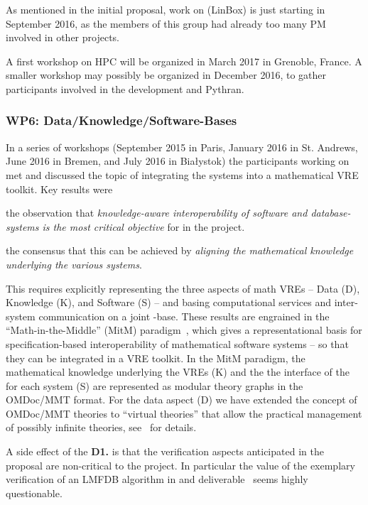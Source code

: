 \documentclass{deliverablereport}
\begin{document}
As mentioned in the initial proposal, work on  (LinBox) is just
starting in September 2016, as the members of this group had already too many PM
involved in other projects.

A first workshop on HPC will be organized in March 2017 in Grenoble, France. A
smaller workshop may possibly be organized in December 2016, to gather
participants involved in the development and Pythran.


\subsubsection{WP6: Data/Knowledge/Software-Bases }

In a series of workshops (September 2015 in Paris, January 2016 in St. Andrews, June 2016
in Bremen, and July 2016 in Bia{\l}ystok) the participants working on  met
and discussed the topic of integrating the \pn systems into a mathematical VRE toolkit.
Key results were
\begin{compactitem}[\bf D1.]
\item the observation that \emph{knowledge-aware interoperability of software and
    database-systems is the most critical objective} for  in the \pn
  project.
\item the consensus that this can be achieved by \emph{aligning the mathematical knowledge
    underlying the various systems}.
\end{compactitem}
This requires explicitly representing the three aspects of math VREs -- Data (D),
Knowledge (K), and Software (S) -- and basing computational services and inter-system
communication on a joint \DKS-base. These results are engrained in the
``Math-in-the-Middle'' (MitM) paradigm~\cite{DehKohKon:iop16}, which gives a
representational basis for specification-based interoperability of mathematical software
systems -- so that they can be integrated in a VRE toolkit. In the MitM paradigm, the
mathematical knowledge underlying the VREs (K) and the the interface of the for each
system (S) are represented as modular theory graphs in the OMDoc/MMT format. For the data
aspect (D) we have extended the concept of OMDoc/MMT theories to ``virtual theories'' that
allow the practical management of possibly infinite theories, see~\cite{ODK-D6.2} for
details. 

A side effect of the \textbf{D1.} is that the verification aspects anticipated in the
proposal are non-critical to the \pn project. In particular the value of the exemplary
verification of an LMFDB algorithm in  and
deliverable~ seems highly questionable. 
\end{document}
